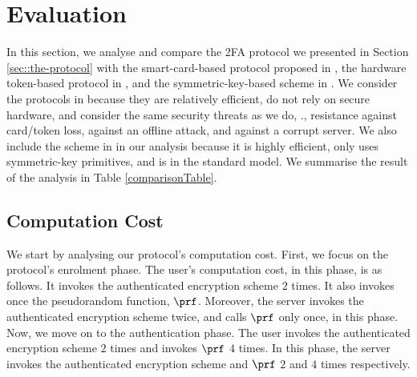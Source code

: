 

\section{Evaluation}\label{app:long-eval}

In this section, we analyse and compare the 2FA protocol we presented in Section \ref{sec::the-protocol} with the smart-card-based protocol proposed in  \cite{WangW18}, the hardware token-based protocol in \cite{JareckiJKSS21}, and the symmetric-key-based scheme in  \cite{MatsuoMY11}.  We consider the protocols in  \cite{WangW18,JareckiJKSS21} because they are relatively efficient, do not rely on secure hardware, and consider the same security threats as we do, \ie., resistance against card/token loss, against an offline attack, and against a corrupt server. We also include the scheme in  \cite{MatsuoMY11}  in our analysis because it is highly efficient, only uses symmetric-key primitives, and is in the standard model. We summarise the result of the analysis in Table \ref{comparisonTable}. 









\subsection{Computation Cost}

We start by analysing our protocol's computation cost. First, we focus on the protocol's enrolment phase. The user's computation cost, in this phase, is as follows. It invokes the authenticated encryption scheme $2$ times. It also invokes once the pseudorandom function, $\prf$.
%
% 
  Moreover, the server invokes the authenticated encryption scheme twice, and calls $\prf$ only once, in this phase. 
%  
%
Now, we move on to the authentication phase. The user invokes the authenticated encryption scheme $2$ times and invokes $\prf$ $4$ times. 
%
%
 In this phase, the server invokes the authenticated encryption scheme and $\prf$ $2$ and $4$ times respectively. %

